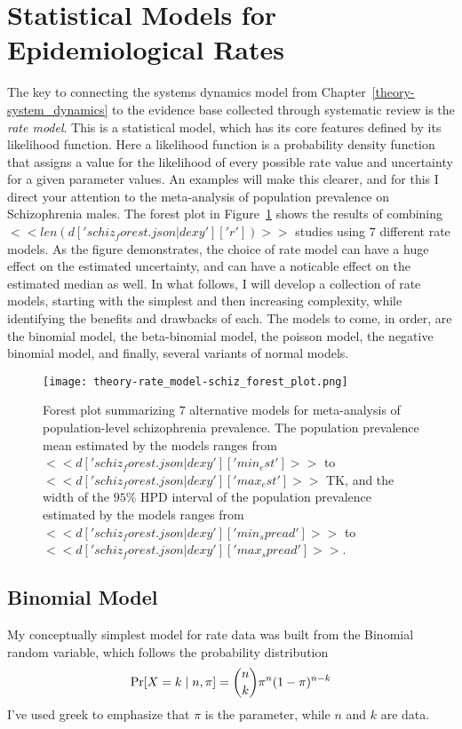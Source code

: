 \section{Statistical Models for Epidemiological Rates}
\label{theory-rate_model}

The key to connecting the systems dynamics model from
Chapter~\ref{theory-system_dynamics} to the evidence base collected
through systematic review is the \emph{rate model}.  This is a
statistical model, which has its core features defined by its
likelihood function.  Here a likelihood function is a probability
density function that assigns a value for the likelihood of every
possible rate value and uncertainty for a given parameter values.  An
examples will make this clearer, and for this I direct your attention
to the meta-analysis of population prevalence on Schizophrenia males.
The forest plot in Figure~\ref{fig:theory-rate_model-schiz_forest}
shows the results of combining $<<
len(d['schiz_forest.json|dexy']['r']) >>$ studies using $7$ different
rate models.  As the figure demonstrates, the choice of rate model can
have a huge effect on the estimated uncertainty, and can have a
noticable effect on the estimated median as well. In what follows, I
will develop a collection of rate models, starting with the simplest
and then increasing complexity, while identifying the benefits and
drawbacks of each.  The models to come, in order, are the binomial
model, the beta-binomial model, the poisson model, the negative
binomial model, and finally, several variants of normal models.

\begin{figure}
\begin{center}
\texttt{[image: theory-rate\_model-schiz\_forest\_plot.png]}
\end{center}
\caption{Forest plot summarizing $7$ alternative models for
  meta-analysis of population-level schizophrenia prevalence.  The
  population prevalence mean estimated by the models ranges from $<<
  d['schiz_forest.json|dexy']['min_est'] >>$ to $<<
  d['schiz_forest.json|dexy']['max_est'] >>$
  TK, and the width of the $95\%$ HPD interval of the population
  prevalence estimated by the models ranges from $<<
  d['schiz_forest.json|dexy']['min_spread'] >>$ to $<<
  d['schiz_forest.json|dexy']['max_spread'] >>$.}
\label{fig:theory-rate_model-schiz_forest}
\end{figure}

\subsection{Binomial Model}
My conceptually simplest model for rate data was built from the
Binomial random variable, which follows the probability distribution
\[
\operatorname{Pr}[X=k\;|\; n,\pi] = \binom{n}{k}\pi^n(1-\pi)^{n-k}
\]
I've used greek to emphasize that $\pi$ is the parameter, while $n$
and $k$ are data.

